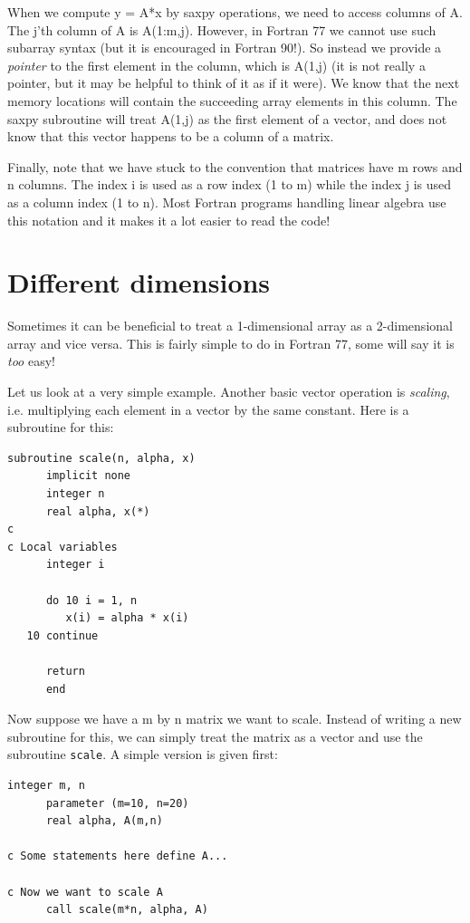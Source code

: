 When we compute y = A*x by saxpy operations, we need to access columns of A. The j'th column of A is A(1:m,j). However, in Fortran 77 we cannot use such subarray syntax (but it is encouraged in Fortran 90!). So instead we provide a \emph{pointer} to the first element in the column, which is A(1,j) (it is not really a pointer, but it may be helpful to think of it as if it were). We know that the next memory locations will contain the succeeding array elements in this column. The saxpy subroutine will treat A(1,j) as the first element of a vector, and does not know that this vector happens to be a column of a matrix.

Finally, note that we have stuck to the convention that matrices have m rows and n columns. The index i is used as a row index (1 to m) while the index j is used as a column index (1 to n). Most Fortran programs handling linear algebra use this notation and it makes it a lot easier to read the code!

\section{Different dimensions}

Sometimes it can be beneficial to treat a 1-dimensional array as a 2-dimensional array and vice versa. This is fairly simple to do in Fortran 77, some will say it is \emph{too} easy!

Let us look at a very simple example. Another basic vector operation is \emph{scaling}, i.e. multiplying each element in a vector by the same constant. Here is a subroutine for this:

\begin{lstlisting}[style=fortran77]
      subroutine scale(n, alpha, x)
      implicit none
      integer n
      real alpha, x(*)
c
c Local variables
      integer i

      do 10 i = 1, n
         x(i) = alpha * x(i)
   10 continue

      return
      end
\end{lstlisting}

Now suppose we have a m by n matrix we want to scale. Instead of writing a new subroutine for this, we can simply treat the matrix as a vector and use the subroutine \texttt{scale}. A simple version is given first:

\begin{lstlisting}[style=fortran77]
      integer m, n
      parameter (m=10, n=20)
      real alpha, A(m,n)

c Some statements here define A...

c Now we want to scale A
      call scale(m*n, alpha, A)
\end{lstlisting}

